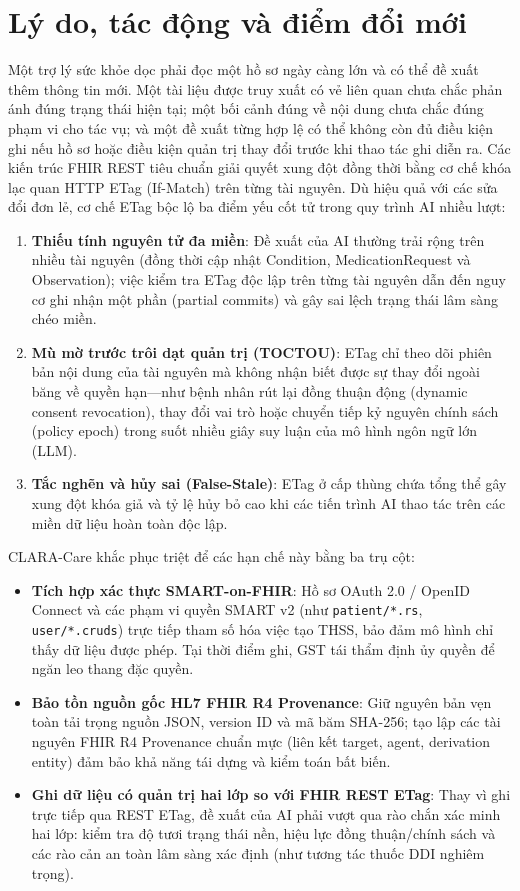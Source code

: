 \documentclass[10pt]{article}
\begin{document}
\section{Lý do, tác động và điểm đổi mới}
Một trợ lý sức khỏe dọc phải đọc một hồ sơ ngày càng lớn và có thể đề xuất thêm thông tin mới. Một tài liệu được truy xuất có vẻ liên quan chưa chắc phản ánh đúng trạng thái hiện tại; một bối cảnh đúng về nội dung chưa chắc đúng phạm vi cho tác vụ; và một đề xuất từng hợp lệ có thể không còn đủ điều kiện ghi nếu hồ sơ hoặc điều kiện quản trị thay đổi trước khi thao tác ghi diễn ra. Các kiến trúc FHIR REST tiêu chuẩn giải quyết xung đột đồng thời bằng cơ chế khóa lạc quan HTTP ETag (If-Match) trên từng tài nguyên. Dù hiệu quả với các sửa đổi đơn lẻ, cơ chế ETag bộc lộ ba điểm yếu cốt tử trong quy trình AI nhiều lượt:
\begin{enumerate}[leftmargin=*]
\item \textbf{Thiếu tính nguyên tử đa miền}: Đề xuất của AI thường trải rộng trên nhiều tài nguyên (đồng thời cập nhật Condition, MedicationRequest và Observation); việc kiểm tra ETag độc lập trên từng tài nguyên dẫn đến nguy cơ ghi nhận một phần (partial commits) và gây sai lệch trạng thái lâm sàng chéo miền.
\item \textbf{Mù mờ trước trôi dạt quản trị (TOCTOU)}: ETag chỉ theo dõi phiên bản nội dung của tài nguyên mà không nhận biết được sự thay đổi ngoài băng về quyền hạn---như bệnh nhân rút lại đồng thuận động (dynamic consent revocation), thay đổi vai trò hoặc chuyển tiếp kỷ nguyên chính sách (policy epoch) trong suốt nhiều giây suy luận của mô hình ngôn ngữ lớn (LLM).
\item \textbf{Tắc nghẽn và hủy sai (False-Stale)}: ETag ở cấp thùng chứa tổng thể gây xung đột khóa giả và tỷ lệ hủy bỏ cao khi các tiến trình AI thao tác trên các miền dữ liệu hoàn toàn độc lập.
\end{enumerate}

CLARA-Care khắc phục triệt để các hạn chế này bằng ba trụ cột:
\begin{itemize}[leftmargin=*]
\item \textbf{Tích hợp xác thực SMART-on-FHIR}: Hồ sơ OAuth 2.0 / OpenID Connect và các phạm vi quyền SMART v2 (như \texttt{patient/*.rs}, \texttt{user/*.cruds}) trực tiếp tham số hóa việc tạo THSS, bảo đảm mô hình chỉ thấy dữ liệu được phép. Tại thời điểm ghi, GST tái thẩm định ủy quyền để ngăn leo thang đặc quyền.
\item \textbf{Bảo tồn nguồn gốc HL7 FHIR R4 Provenance}: Giữ nguyên bản vẹn toàn tải trọng nguồn JSON, version ID và mã băm SHA-256; tạo lập các tài nguyên FHIR R4 Provenance chuẩn mực (liên kết target, agent, derivation entity) đảm bảo khả năng tái dựng và kiểm toán bất biến.
\item \textbf{Ghi dữ liệu có quản trị hai lớp so với FHIR REST ETag}: Thay vì ghi trực tiếp qua REST ETag, đề xuất của AI phải vượt qua rào chắn xác minh hai lớp: kiểm tra độ tươi trạng thái nền, hiệu lực đồng thuận/chính sách và các rào cản an toàn lâm sàng xác định (như tương tác thuốc DDI nghiêm trọng).
\end{itemize}
\end{document}
